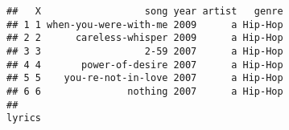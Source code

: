 \documentclass[]{article}
\begin{document}
\begin{verbatim}
##   X                  song year artist   genre
## 1 1 when-you-were-with-me 2009      a Hip-Hop
## 2 2      careless-whisper 2009      a Hip-Hop
## 3 3                  2-59 2007      a Hip-Hop
## 4 4       power-of-desire 2007      a Hip-Hop
## 5 5    you-re-not-in-love 2007      a Hip-Hop
## 6 6               nothing 2007      a Hip-Hop
##                                                                                                                                                                                                                                                                                                                                                                                                                                                                                                                                                                                                                                                                                                                                                                                                                                                                                                                                                                                                                                                                                                                                                                                                                                                                                                                                                                                                                                                                                                                                                                                                                                                                                                                                                                                                                                                                                        lyrics

\end{verbatim}
\end{document}
